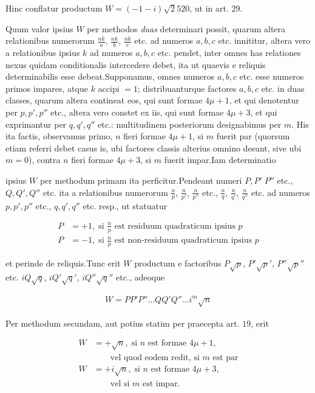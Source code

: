 Hinc conflatur productum $W=(-1-i)\surd2520$, ut in art. $29$.


Quum valor ipsius $W$ per methodos \textit{duas} determinari possit, quarum altera relationibus numerorum $\frac{nk}{a}$, $\frac{nk}{b}$, $\frac{nk}{c}$ etc. ad numeros $a,b,c$ etc. innititur, altera vero a relationibus ipsius $k$ ad numeros $a,b,c$ etc. pendet, inter omnes has relationes nexus quidam conditionalis intercedere debet, ita ut quaevis e reliquis determinabilis esse debeat.\quad Supponamus, omnes numeros $a,b,c$ etc. esse numeros primos impares, atque $k$ accipi $=1$; distribuanturque factores $a,b,c$ etc. in duas classes, quarum altera contineat eos, qui sunt formae $4\mu+1$, et qui denotentur per $p,p',p''$ etc., altera vero constet ex iis, qui sunt formae $4\mu+3$, et qui exprimantur per $q,q',q''$ etc.: multitudinem posteriorum designabimus per $m$. His ita factis, observamus primo, $n$ fieri formae $4\mu+1$, si $m$ fuerit par (quorsum etiam referri debet casus is, ubi factores classis alterius omnino desunt, sive ubi $m=0$), contra $n$ fieri formae $4\mu+3$, si $m$ fuerit impar.\quad Iam determinatio

ipsius $W$ per methodum primam ita perficitur.\quad Pendeant numeri $P,P'\;P''$ etc., $Q,Q',Q''$ etc. ita a relationibus numerorum $\frac{n}{p}$, $\frac{n}{p'}$, $\frac{n}{p''}$ etc., $\frac{n}{q}$, $\frac{n}{q'}$, $\frac{n}{q''}$ etc. ad numeros $p,p',p''$ etc., $q,q',q''$ etc. resp., ut statuatur

\[
\begin{aligned}
P&=+1,\;\text{si }\frac{n}{p}\text{ est residuum quadraticum ipsius }p\\
P&=-1,\;\text{si }\frac{n}{p}\text{ est non-residuum quadraticum ipsius }p
\end{aligned}
\]

et perinde de reliquis.\quad Tunc erit $W$ productum e factoribus $P\surd p$, $P'\surd p'$, $P''\surd p''$ etc. $iQ\surd q$, $iQ'\surd q'$, $iQ''\surd q''$ etc., adeoque

\[
\begin{aligned}
W=PP'P''\ldots QQ'Q''\ldots i^m\surd n
\end{aligned}
\]

Per methodum secundam, aut potius statim per praecepta art. $19$, erit

\[
\begin{aligned}
W&=+\surd n,\;\text{si }n\text{ est formae }4\mu+1,\\&\qquad\text{vel quod eodem redit, si }m\text{ est par}\\
W&=+i\surd n,\;\text{si }n\text{ est formae }4\mu+3,\\&\qquad\text{vel si }m\text{ est impar.}
\end{aligned}
\]

